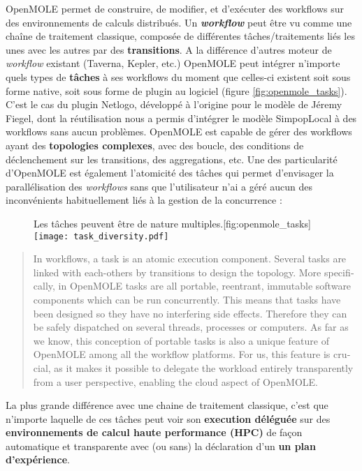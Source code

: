 OpenMOLE permet de construire, de modifier, et d'exécuter des workflows sur des environnements de calculs distribués. Un \textbf{\textit{workflow}} peut être vu comme une chaîne de traitement classique, composée de différentes tâches/traitements liés les unes avec les autres par des \textbf{transitions}. A la différence d'autres moteur de \textit{workflow} existant (Taverna, Kepler, etc.) OpenMOLE peut intégrer n'importe quels types de \textbf{tâches} à ses workflows du moment que celles-ci existent soit sous forme native, soit sous forme de plugin au logiciel (figure \ref{fig:openmole_tasks}). C'est le cas du plugin Netlogo, développé à l'origine pour le modèle de Jéremy Fiegel, dont la réutilisation nous a permis d'intégrer le modèle SimpopLocal à des workflows sans aucun problèmes. OpenMOLE est capable de gérer des workflows ayant des \textbf{topologies complexes}, avec des boucle, des conditions de déclenchement sur les transitions, des aggregations, etc. Une des particularité d'OpenMOLE est également l'atomicité des tâches qui permet d'envisager la parallélisation des \textit{workflows} sans que l'utilisateur n'ai a géré aucun des inconvénients habituellement liés à la gestion de la concurrence :

\begin{figure}[!htbp]
	\begin{sidecaption}[fortoc]{Les tâches peuvent être de nature multiples.}[fig:openmole_tasks]
		\centering
		\texttt{[image: task\_diversity.pdf]}{
		}
  \end{sidecaption}
\end{figure}


\foreignblockquote{english}[{\cite[7]{Reuillon2013}}]{In workflows, a task is an atomic execution component. Several tasks are linked with each-others by transitions to design the topology. More specifically, in OpenMOLE tasks are all portable, reentrant, immutable software components which can be run concurrently. This means that tasks have been designed so they have no interfering side effects. Therefore they can be safely dispatched on several threads, processes or computers. As far as we know, this conception of portable tasks is also a unique feature of OpenMOLE among all the workflow platforms. For us, this feature is crucial, as it makes it possible to delegate the workload entirely transparently from a user perspective, enabling the cloud aspect of OpenMOLE.}

La plus grande différence avec une chaine de traitement classique, c'est que n'importe laquelle de ces tâches peut voir son \textbf{execution déléguée} sur des \textbf{environnements de calcul haute performance (HPC)} de façon automatique et transparente avec (ou sans) la déclaration d'un \textbf{un plan d'expérience}.

